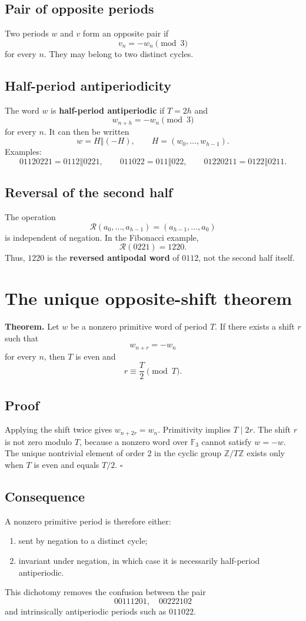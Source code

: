 \documentclass[11pt,a4paper]{article}
\newcommand{\F}{\mathbb F}\newcommand{\Z}{\mathbb Z}\newcommand{\concat}{\mathbin{\Vert}}
\begin{document}
\subsection{Pair of opposite periods}
Two periods \(w\) and \(v\) form an opposite pair if \[v_n=-w_n\pmod 3\] for every \(n\). They may belong to two distinct cycles.
\subsection{Half-period antiperiodicity}
The word \(w\) is \textbf{half-period antiperiodic} if \(T=2h\) and \[w_{n+h}=-w_n\pmod 3\] for every \(n\). It can then be written \[w=H\concat(-H),\qquad H=(w_0,\ldots,w_{h-1}).\] Examples: \[01120221=0112\concat0221,\qquad 011022=011\concat022,\qquad 01220211=0122\concat0211.\]
\subsection{Reversal of the second half}
The operation \[\mathcal R(a_0,\ldots,a_{h-1})=(a_{h-1},\ldots,a_0)\] is independent of negation. In the Fibonacci example, \[\mathcal R(0221)=1220.\] Thus, \(1220\) is the \textbf{reversed antipodal word} of \(0112\), not the second half itself.
\section{The unique opposite-shift theorem}
\begin{summarybox}\textbf{Theorem.} Let \(w\) be a nonzero primitive word of period \(T\). If there exists a shift \(r\) such that \[w_{n+r}=-w_n\] for every \(n\), then \(T\) is even and \[r\equiv \frac{T}{2}\pmod T.\]\end{summarybox}
\subsection*{Proof}
Applying the shift twice gives \(w_{n+2r}=w_n\). Primitivity implies \(T\mid 2r\). The shift \(r\) is not zero modulo \(T\), because a nonzero word over \(\F_3\) cannot satisfy \(w=-w\). The unique nontrivial element of order 2 in the cyclic group \(\Z/T\Z\) exists only when \(T\) is even and equals \(T/2\). \hfill\(\square\)
\subsection*{Consequence}
A nonzero primitive period is therefore either: \begin{enumerate}\item sent by negation to a distinct cycle;\item invariant under negation, in which case it is necessarily half-period antiperiodic.\end{enumerate} This dichotomy removes the confusion between the pair \[00111201,\quad 00222102\] and intrinsically antiperiodic periods such as \(011022\).
\end{document}
